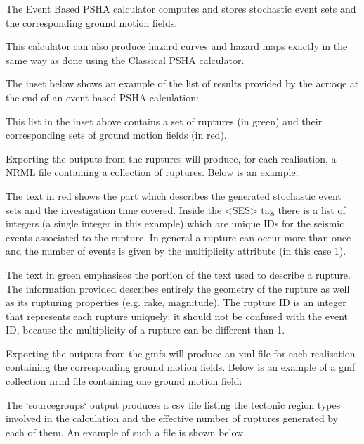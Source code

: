 The Event Based PSHA calculator computes and stores stochastic event sets and
the corresponding ground motion fields.

This calculator can also produce hazard curves and hazard maps exactly in the
same way as done using the Classical PSHA calculator.

The inset below shows an example of the list of results provided by the
\gls{acr:oqe} at the end of an event-based PSHA calculation:



This list in the inset above contains a set of ruptures (in green)
and their corresponding sets of ground motion fields (in red).

Exporting the outputs from the ruptures will produce, for each
realisation, a NRML file containing a collection of ruptures.
Below is an example:



The text in red shows the part which describes the generated
stochastic event sets and the investigation time covered. Inside the
<SES> tag there is a list of integers (a single integer in this example)
which are unique IDs for the seismic events associated to the rupture.
In general a rupture can occur more than once and the number of events
is given by the multiplicity attribute (in this case 1).

The text in green emphasises the portion of the text used to describe a
rupture. The information provided describes entirely the geometry of the
rupture as well as its rupturing properties (e.g. rake, magnitude). The
rupture ID is an integer that represents each rupture uniquely: it should
not be confused with the event ID, because the multiplicity of a rupture
can be different than 1.

Exporting the outputs from the gmfs will produce an xml file for each
realisation containing the corresponding ground motion fields. Below is an
example of a gmf collection nrml file containing one ground motion field:



The `sourcegroups` output produces a csv file listing the tectonic region
types involved in the calculation and the effective number of ruptures
generated by each of them. An example of such a file is shown below.


